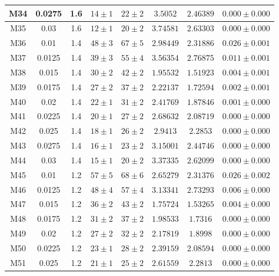 \documentclass[12pt,a4paper]{report}
\begin{document}
\begin{center}
\begin{longtable}{||c|c|c|c|c|c|c|c||}
M34 & 0.0275 & 1.6 & $ 14 \pm 1 $ & $ 22 \pm 2 $ & $ 3.5052 $ & $ 2.46389 $ & $ 0.000 \pm 0.000 $ \\ \hline
M35 & 0.03 & 1.6 & $ 12 \pm 1 $ & $ 20 \pm 2 $ & $ 3.74581 $ & $ 2.63303 $ & $ 0.000 \pm 0.000 $ \\ \hline
M36 & 0.01 & 1.4 & $ 48 \pm 3 $ & $ 67 \pm 5 $ & $ 2.98449 $ & $ 2.31886 $ & $ 0.026 \pm 0.001 $ \\ \hline
M37 & 0.0125 & 1.4 & $ 39 \pm 3 $ & $ 55 \pm 4 $ & $ 3.56354 $ & $ 2.76875 $ & $ 0.011 \pm 0.001 $ \\ \hline
M38 & 0.015 & 1.4 & $ 30 \pm 2 $ & $ 42 \pm 2 $ & $ 1.95532 $ & $ 1.51923 $ & $ 0.004 \pm 0.001 $ \\ \hline
M39 & 0.0175 & 1.4 & $ 27 \pm 2 $ & $ 37 \pm 2 $ & $ 2.22137 $ & $ 1.72594 $ & $ 0.002 \pm 0.001 $ \\ \hline
M40 & 0.02 & 1.4 & $ 22 \pm 1 $ & $ 31 \pm 2 $ & $ 2.41769 $ & $ 1.87846 $ & $ 0.001 \pm 0.000 $ \\ \hline
M41 & 0.0225 & 1.4 & $ 20 \pm 1 $ & $ 27 \pm 2 $ & $ 2.68632 $ & $ 2.08719 $ & $ 0.000 \pm 0.000 $ \\ \hline
M42 & 0.025 & 1.4 & $ 18 \pm 1 $ & $ 26 \pm 2 $ & $ 2.9413 $ & $ 2.2853 $ & $ 0.000 \pm 0.000 $ \\ \hline
M43 & 0.0275 & 1.4 & $ 16 \pm 1 $ & $ 23 \pm 2 $ & $ 3.15001 $ & $ 2.44746 $ & $ 0.000 \pm 0.000 $ \\ \hline
M44 & 0.03 & 1.4 & $ 15 \pm 1 $ & $ 20 \pm 2 $ & $ 3.37335 $ & $ 2.62099 $ & $ 0.000 \pm 0.000 $ \\ \hline
M45 & 0.01 & 1.2 & $ 57 \pm 5 $ & $ 68 \pm 6 $ & $ 2.65279 $ & $ 2.31376 $ & $ 0.026 \pm 0.002 $ \\ \hline
M46 & 0.0125 & 1.2 & $ 48 \pm 4 $ & $ 57 \pm 4 $ & $ 3.13341 $ & $ 2.73293 $ & $ 0.006 \pm 0.000 $ \\ \hline
M47 & 0.015 & 1.2 & $ 36 \pm 2 $ & $ 43 \pm 2 $ & $ 1.75724 $ & $ 1.53265 $ & $ 0.004 \pm 0.000 $ \\ \hline
M48 & 0.0175 & 1.2 & $ 31 \pm 2 $ & $ 37 \pm 2 $ & $ 1.98533 $ & $ 1.7316 $ & $ 0.000 \pm 0.000 $ \\ \hline
M49 & 0.02 & 1.2 & $ 27 \pm 2 $ & $ 32 \pm 2 $ & $ 2.17819 $ & $ 1.8998 $ & $ 0.000 \pm 0.000 $ \\ \hline
M50 & 0.0225 & 1.2 & $ 23 \pm 1 $ & $ 28 \pm 2 $ & $ 2.39159 $ & $ 2.08594 $ & $ 0.000 \pm 0.000 $ \\ \hline
M51 & 0.025 & 1.2 & $ 21 \pm 1 $ & $ 25 \pm 2 $ & $ 2.61559 $ & $ 2.2813 $ & $ 0.000 \pm 0.000 $ \\ \hline

\end{longtable}
\end{center}
\end{document}
